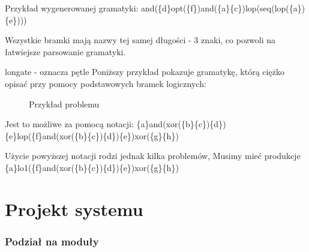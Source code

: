 Przykład wygenerowanej gramatyki:
and(\{d\}opt(\{f\})and(\{a\}\{c\})lop(seq(lop(\{a\})\{e\})))

Wszystkie bramki mają nazwy tej samej długości - 3 znaki, co pozwoli na łatwiejsze parsowanie gramatyki.

longate - oznacza pętle 
Poniższy przykład pokazuje gramatykę, którą ciężko opisać przy pomocy podstawowych bramek logicznych: 
\begin{figure}[h]
	\caption{\label{fig:subcaption_example}Przykład problemu}
\end{figure}

Jest to możliwe za pomocą notacji: 
\{a\}and(xor(\{b\}\{c\})\{d\})\{e\}lop(\{f\}and(xor(\{b\}\{c\})\{d\})\{e\})xor(\{g\}\{h\})

Użycie powyższej notacji rodzi jednak kilka problemów, Musimy mieć produkcje 
\{a\}lo1(\{f\}and(xor(\{b\}\{c\})\{d\})\{e\})xor(\{g\}\{h\})
\clearpage

\section{Projekt systemu}

\subsubsection{Podział na moduły}

